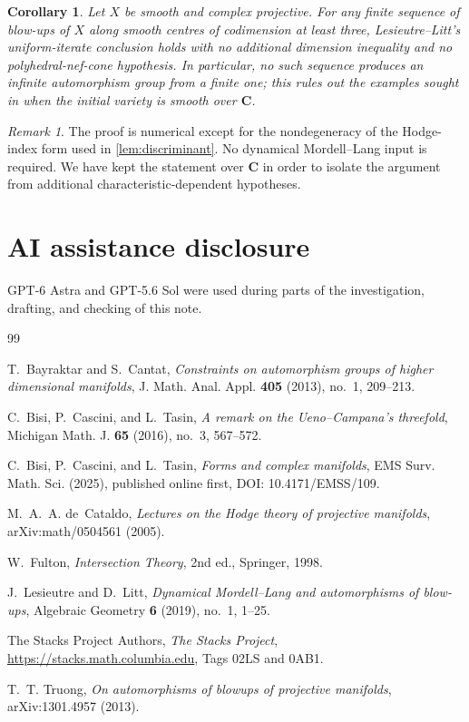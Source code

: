 \documentclass[11pt,reqno]{amsart}
\newcommand{\C}{\mathbf C}
\newtheorem{corollary}[theorem]{Corollary}
\theoremstyle{remark}
\newtheorem{remark}[theorem]{Remark}
\begin{document}
\begin{corollary}\label{cor:LL}
Let $X$ be smooth and complex projective.  For any finite sequence of blow-ups of $X$ along smooth centres of codimension at least three, Lesieutre--Litt's uniform-iterate conclusion holds with no additional dimension inequality and no polyhedral-nef-cone hypothesis.  In particular, no such sequence produces an infinite automorphism group from a finite one; this rules out the examples sought in \cite[Question~1.8]{LesieutreLitt2019} when the initial variety is smooth over $\C$.
\end{corollary}

\begin{remark}\label{rem:scope}
The proof is numerical except for the nondegeneracy of the Hodge-index form used in \cref{lem:discriminant}.  No dynamical Mordell--Lang input is required.  We have kept the statement over $\C$ in order to isolate the argument from additional characteristic-dependent hypotheses.
\end{remark}

\section*{AI assistance disclosure}
GPT-6 Astra and GPT-5.6 Sol were used during parts of the investigation, drafting, and checking of this note.

\begin{thebibliography}{99}

T.~Bayraktar and S.~Cantat,
\emph{Constraints on automorphism groups of higher dimensional manifolds},
J. Math. Anal. Appl. \textbf{405} (2013), no.~1, 209--213.

C.~Bisi, P.~Cascini, and L.~Tasin,
\emph{A remark on the Ueno--Campana's threefold},
Michigan Math. J. \textbf{65} (2016), no.~3, 567--572.

C.~Bisi, P.~Cascini, and L.~Tasin,
\emph{Forms and complex manifolds},
EMS Surv. Math. Sci. (2025), published online first, DOI: 10.4171/EMSS/109.

M.~A.~A. de~Cataldo,
\emph{Lectures on the Hodge theory of projective manifolds},
arXiv:math/0504561 (2005).

W.~Fulton,
\emph{Intersection Theory}, 2nd ed.,
Springer, 1998.

J.~Lesieutre and D.~Litt,
\emph{Dynamical Mordell--Lang and automorphisms of blow-ups},
Algebraic Geometry \textbf{6} (2019), no.~1, 1--25.

The Stacks Project Authors,
\emph{The Stacks Project},
\url{https://stacks.math.columbia.edu}, Tags 02LS and 0AB1.

T.~T. Truong,
\emph{On automorphisms of blowups of projective manifolds},
arXiv:1301.4957 (2013).

\end{thebibliography}
\end{document}
